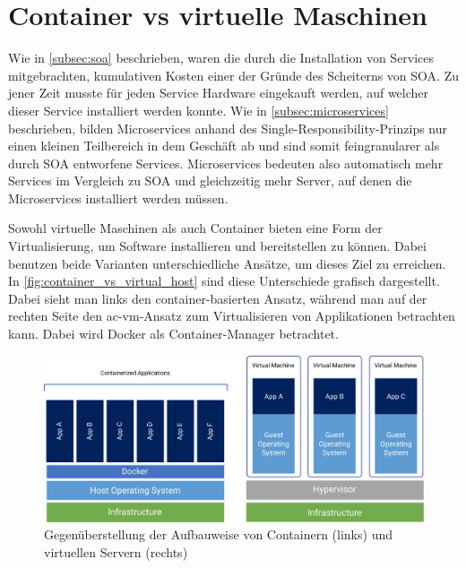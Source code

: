 \section{Container vs virtuelle Maschinen}
\label{sec:container_vs_virtual_machines}
Wie in \autoref{subsec:soa} beschrieben, waren die durch die Installation von Services mitgebrachten, kumulativen Kosten einer der Gründe des Scheiterns von SOA. Zu jener Zeit musste für jeden Service Hardware eingekauft werden, auf welcher dieser Service installiert werden konnte. Wie in \autoref{subsec:microservices} beschrieben, bilden Microservices anhand des Single-Responsibility-Prinzips nur einen kleinen Teilbereich in dem Geschäft ab und sind somit feingranularer als durch SOA entworfene Services. Microservices bedeuten also automatisch mehr Services im Vergleich zu SOA und gleichzeitig mehr Server, auf denen die Microservices installiert werden müssen.

Sowohl virtuelle Maschinen als auch Container bieten eine Form der Virtualisierung, um Software installieren und bereitstellen zu können. Dabei benutzen beide Varianten unterschiedliche Ansätze, um dieses Ziel zu erreichen. In \autoref{fig:container_vs_virtual_host} sind diese Unterschiede grafisch dargestellt. Dabei sieht man links den container-basierten Ansatz, während man auf der rechten Seite den \gls{ac-vm}-Ansatz zum Virtualisieren von Applikationen betrachten kann. Dabei wird Docker als Container-Manager betrachtet.

\begin{figure}[!ht]
  \centering
    \includegraphics[width=\textwidth]{res/img/Container_vs_Virtual_Host.pdf}
  \caption{Gegenüberstellung der Aufbauweise von Containern (links) und virtuellen Servern (rechts) \parencite{fong2018containervsvirtualhosts}}
  \label{fig:container_vs_virtual_host}
\end{figure}

